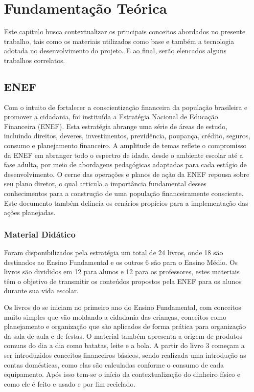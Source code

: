 \chapter{Fundamentação Teórica}
    Este capitulo busca contextualizar os principais conceitos abordados no presente trabalho, tais como os materiais utilizados como base e também a tecnologia adotada no desenvolvimento do projeto. E ao final, serão elencados alguns trabalhos correlatos.

    \section{ENEF}
        Com o intuito de fortalecer a conscientização financeira da população brasileira e promover a cidadania, foi instituída a Estratégia Nacional de Educação Financeira (ENEF). Esta estratégia abrange uma série de áreas de estudo, incluindo direitos, deveres, investimentos, previdência, poupança, crédito, seguros, consumo e planejamento financeiro. A amplitude de temas reflete o compromisso da ENEF em abranger todo o espectro de idade, desde o ambiente escolar até a fase adulta, por meio de abordagens pedagógicas adaptadas para cada estágio de desenvolvimento. O cerne das operações e planos de ação da ENEF repousa sobre seu plano diretor, o qual articula a importância fundamental desses conhecimentos para a construção de uma população financeiramente consciente. Este documento também delineia os cenários propícios para a implementação das ações planejadas.

        \subsection{Material Didático}
            Foram disponibilizados pela estratégia um total de 24 livros, onde 18 são destinados ao Ensino Fundamental e os outros 6 são para o Ensino Médio. Os livros são divididos em 12 para alunos e 12 para os professores, estes materiais têm o objetivo de transmitir os conteúdos propostos pela ENEF para os alunos durante sua vida escolar.

            Os livros do se iniciam no primeiro ano do Ensino Fundamental, com conceitos muito simples que vão moldando a cidadania das crianças, conceitos como planejamento e organização que são aplicados de forma prática para organização da sala de aula e de festas. O material também apresenta a origem de produtos comuns do dia a dia como batatas, leite e a bola. A partir do livro 3 começam a ser introduzidos conceitos financeiros básicos, sendo realizada uma introdução as contas domésticas, como elas são calculadas conforme o consumo de cada equipamento. Após isso tem-se o início da contextualização do dinheiro físico e como ele é feito e usado e por fim reciclado.

